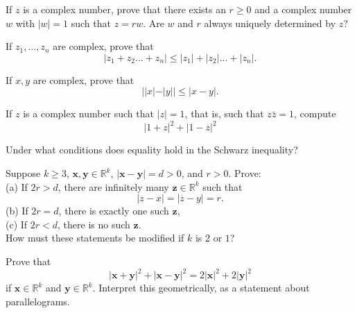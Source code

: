 \begin{myExercise}
    If $z$ is a complex number, prove that there exists an $r \geq 0$ and a complex number
    $w$ with $|w| = 1$ such that $z =rw$. Are $w$ and $r$ always uniquely determined by $z$?
\end{myExercise}

\begin{myExercise}
    If $z_1 ,..., z_n$ are complex, prove that
    \begin{equation*}
        |z_1 + z_2 ...+ z_n| \leq 
        |z_1| + |z_2| ...+ |z_n|.
    \end{equation*}
\end{myExercise}

\begin{myExercise}
    If $x, y$ are complex, prove that
    \begin{equation*}
        ||x|-|y|| \leq |x-y|.
    \end{equation*}
\end{myExercise}

\begin{myExercise}
    If $z$ is a complex number such that $|z| = 1$, that is, such that $z\bar{z} = 1$, compute
    \begin{equation*}
        |1+z|^2 + |1-z|^2
    \end{equation*}
\end{myExercise}

\begin{myExercise}
    Under what conditions does equality hold in the Schwarz inequality?
\end{myExercise}

\begin{myExercise}
    Suppose $k \geq 3$, $\mathbf{x}, \mathbf{y} \in \mathbb{R}^k$, $|\mathbf{x} - \mathbf{y}| =d>0$, and $r >0$. Prove:\\
    (a) If $2r > d$, there are infinitely many $\mathbf{z} \in \mathbb{R}^k$ such that
    \begin{equation*}
        |z-x| =|z-y| =r.
    \end{equation*}
    (b) If $2r = d$, there is exactly one such $\mathbf{z}$,\\
    (c) If $2r < d$, there is no such $\mathbf{z}$.\\
    How must these statements be modified if $k$ is $2$ or $1$?
\end{myExercise}

\begin{myExercise}
    Prove that
    \begin{equation*}
        |\mathbf{x} + \mathbf{y}|^2 + 
        |\mathbf{x} - \mathbf{y}|^2 =
        2|\mathbf{x}|^2 + 2|\mathbf{y}|^2
    \end{equation*}
    if $\mathbf{x} \in \mathbb{R}^k$ and $\mathbf{y} \in \mathbb{R}^k$. Interpret this geometrically, as a statement about parallelograms.
\end{myExercise}

